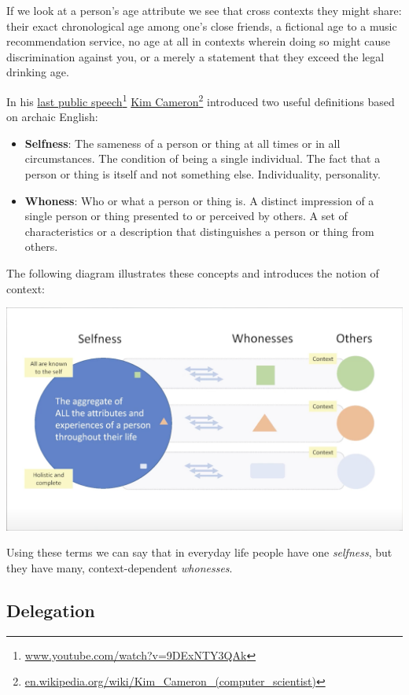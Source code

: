 \documentclass[11pt, oneside]{article}   	%
\newcommand{\hyperfootnote}[1][]{\def\ArgI{{#1}}\hyperfootnoteRelay}
\newcommand\hyperfootnoteRelay[2][]{\href{#1#2}{\ArgI}\footnote{\href{#1#2}{#2}}}
\begin{document}
If we look at a person's age attribute we see that cross contexts they might share: their exact chronological age among one's close friends, a fictional age to a music recommendation service, no age at all in contexts wherein doing so might cause discrimination against you, or a merely a statement that they exceed the legal drinking age. 

In his \hyperfootnote[last public speech][https://]{www.youtube.com/watch?v=9DExNTY3QAk}  
\hyperfootnote[Kim Cameron][https://]{en.wikipedia.org/wiki/Kim\_Cameron\_(computer\_scientist)} introduced two useful definitions based on archaic English:

\begin{itemize}
\item \textbf{Selfness}: The sameness of a person or thing at all times or in all circumstances. The condition of being a single individual. The fact that a person or thing is itself and not something else. Individuality, personality. 
\item \textbf{Whoness}: Who or what a person or thing is. A distinct impression of a single person or thing presented to or perceived by others. A set of characteristics or a description that distinguishes a person or thing from others. 
\end{itemize}

The following diagram illustrates these concepts and introduces the notion of context:

\includegraphics[width=\textwidth]{./images/selfness-and-whoness-larger.png}

Using these terms we can say that in everyday life people have one \emph{selfness}, but they have many, context-dependent \emph{whonesses}. 

\subsection{Delegation}
\end{document}
